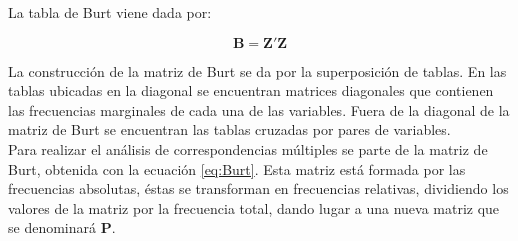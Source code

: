 \documentclass[water,article,submit,moreauthors,pdftex]{mdpi}
\begin{document}
La tabla de Burt viene dada por:

\begin{equation}
\mathbf{B}=\mathbf{Z'}\mathbf{Z}
\label{eq:Burt}
\end{equation}

La construcción de la matriz de Burt se da por la superposición de
tablas. En las tablas ubicadas en la diagonal se encuentran matrices
diagonales que contienen las frecuencias marginales de cada una de las
variables. Fuera de la diagonal de la matriz de Burt se encuentran las
tablas cruzadas por pares de variables.\\
Para realizar el análisis de correspondencias múltiples se parte de la
matriz de Burt, obtenida con la ecuación \ref{eq:Burt}. Esta matriz está
formada por las frecuencias absolutas, éstas se transforman en
frecuencias relativas, dividiendo los valores de la matriz por la
frecuencia total, dando lugar a una nueva matriz que se denominará
\textbf{P}.
\end{document}
